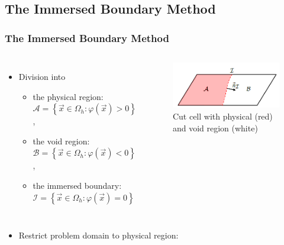 	\subsection{The Immersed Boundary Method}
	\begin{frame}
		\frametitle{The Immersed Boundary Method}
		\begin{columns}[t]
			\column[]{7cm}
			\vspace{-0.5cm}
			\begin{itemize}
				\item Division into
					\begin{itemize}
						\item the physical region:  $\mathcal{A} = \left\{\vec{x} \in \Omega_h : \varphi (\vec{x}) > 0 \right\}$,
						\item the void region:  $\mathcal{B} = \left\{ \vec{x}\in \Omega_h : \varphi (\vec{x}) < 0 \right\}$, 
						\item the immersed boundary: $\mathcal{I} = \left\{ \vec{x}\in \Omega_h : \varphi (\vec{x}) = 0 \right\}$
					\end{itemize} 
			\end{itemize}
			\column[]{5cm}
			\begin{figure}[htbp]
				\vspace{-1cm}
				\includegraphics[width=\textwidth]{img/ibmcut.PNG}
				\caption{Cut cell with physical (red) and void region (white) \cite{paper}}\label{fig:cutcell}
			\end{figure} 
		\end{columns}
		\begin{itemize}
			\item Restrict problem domain to physical region:
		\end{itemize}
		\vspace{-0.3cm}
\end{frame}
